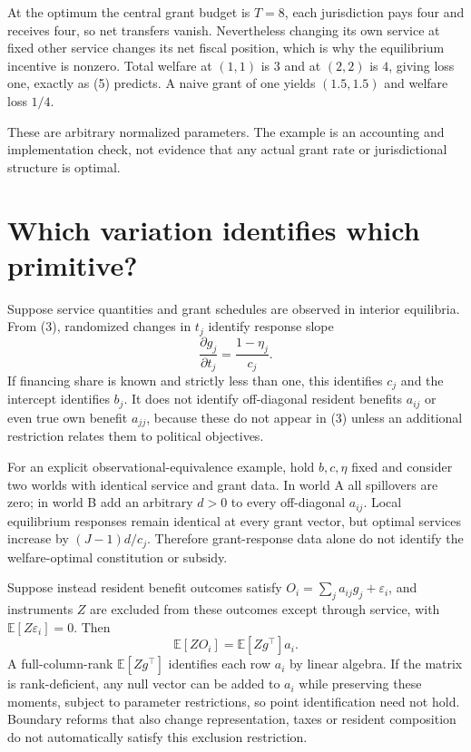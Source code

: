 \documentclass[11pt,a4paper]{article}
\newcommand{\E}{\mathbb E}
\begin{document}
At the optimum the central grant budget is $T=8$, each jurisdiction pays four and receives four, so net transfers vanish. Nevertheless changing its own service at fixed other service changes its net fiscal position, which is why the equilibrium incentive is nonzero. Total welfare at $(1,1)$ is $3$ and at $(2,2)$ is $4$, giving loss one, exactly as (5) predicts. A naive grant of one yields $(1.5,1.5)$ and welfare loss $1/4$.

These are arbitrary normalized parameters. The example is an accounting and implementation check, not evidence that any actual grant rate or jurisdictional structure is optimal.

\section{Which variation identifies which primitive?}
Suppose service quantities and grant schedules are observed in interior equilibria. From (3), randomized changes in $t_j$ identify response slope
\[
 \frac{\partial g_j}{\partial t_j}=\frac{1-\eta_j}{c_j}.
\]
If financing share is known and strictly less than one, this identifies $c_j$ and the intercept identifies $b_j$. It does not identify off-diagonal resident benefits $a_{ij}$ or even true own benefit $a_{jj}$, because these do not appear in (3) unless an additional restriction relates them to political objectives.

For an explicit observational-equivalence example, hold $b,c,\eta$ fixed and consider two worlds with identical service and grant data. In world A all spillovers are zero; in world B add an arbitrary $d>0$ to every off-diagonal $a_{ij}$. Local equilibrium responses remain identical at every grant vector, but optimal services increase by $(J-1)d/c_j$. Therefore grant-response data alone do not identify the welfare-optimal constitution or subsidy.

Suppose instead resident benefit outcomes satisfy
$O_i=\sum_ja_{ij}g_j+\varepsilon_i$, and instruments $Z$ are excluded from these outcomes except through service, with $\E[Z\varepsilon_i]=0$. Then
\[
 \E[ZO_i]=\E[Zg^\top]a_i.                                \tag{6}
\]
A full-column-rank $\E[Zg^\top]$ identifies each row $a_i$ by linear algebra. If the matrix is rank-deficient, any null vector can be added to $a_i$ while preserving these moments, subject to parameter restrictions, so point identification need not hold. Boundary reforms that also change representation, taxes or resident composition do not automatically satisfy this exclusion restriction.
\end{document}
